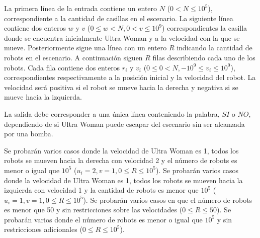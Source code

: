 \documentclass{oci}
\begin{document}
\begin{inputDescription}
  La primera línea de la entrada contiene un entero $N$ ($0<N\leq 10^5$),
  correspondiente a la cantidad de casillas en el escenario.
  La siguiente línea contiene dos enteros $w$ y $v$ ($0\leq w< N, 0<v\leq 10^9$)
  correspondientes la casilla donde se encuentra inicialmente Ultra Woman y a la
  velocidad con la que se mueve.
  Posteriormente sigue una línea con un entero $R$ indicando la cantidad de
  robots en el escenario.
  A continuación siguen $R$ filas describiendo cada uno de los robots.
  Cada fila contiene dos enteros $r_i$ y $v_i$ ($0\leq 0 < N, -10^9\leq v_i\leq
  10^9$), correspondientes respectivamente a la posición inicial y la velocidad
  del robot.
  La velocidad será positiva si el robot se mueve hacia la derecha y negativa si
  se mueve hacia la izquierda.
\end{inputDescription}

\begin{outputDescription}
La salida debe corresponder a una única línea conteniendo la palabra, $SI$ o
$NO$, dependiendo de si Ultra Woman puede escapar del escenario sin ser
alcanzada por una bomba.
\end{outputDescription}

\begin{scoreDescription}
   Se probarán varios casos donde la velocidad de Ultra Woman es 1,
  todos los robots se mueven hacia la derecha con velocidad 2 y el número de
  robots es menor o igual que $10^5$ ($u_i=2, v=1, 0\leq R\leq 10^5$).
   Se probarán varios casos donde la velocidad de Ultra Woman es 1,
  todos los robots se mueven hacia la izquierda con velocidad 1 y la cantidad de
  robots es menor que $10^5$ ($u_i=1, v=1, 0\leq R\leq 10^5$).
   Se probarán varios casos en que el número de robots es menor que 50
  y sin restricciones sobre las velocidades ($0\leq R\leq 50$).
   Se probarán varios donde el número de robots es menor o igual que
  $10^5$ y sin restricciones adicionales ($0\leq R\leq 10^5$).
\end{scoreDescription}

\begin{sampleDescription}
\end{sampleDescription}
\end{document}
